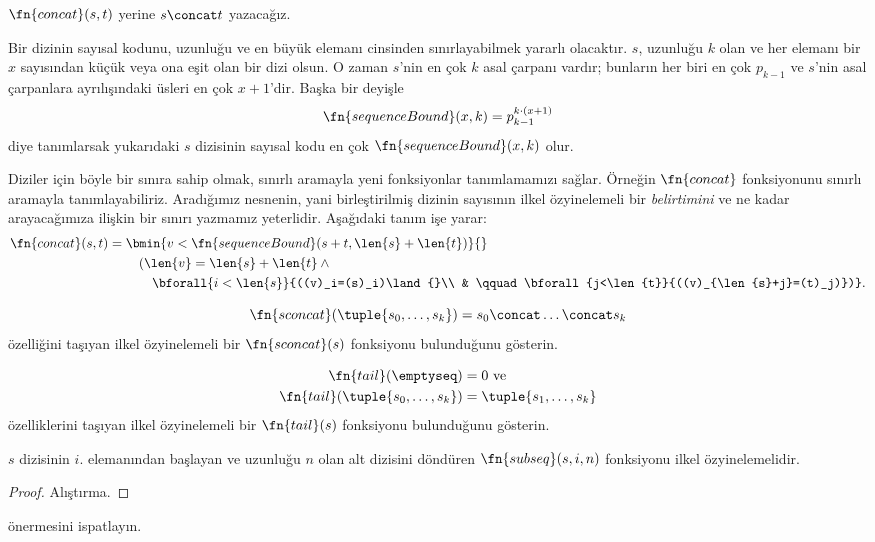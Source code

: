 $\fn{concat}(s,t)$ yerine $s\concat t$ yazacağız.

Bir dizinin sayısal kodunu, uzunluğu ve en büyük elemanı cinsinden
sınırlayabilmek yararlı olacaktır. $s$, uzunluğu $k$ olan ve her elemanı
bir $x$ sayısından küçük veya ona eşit olan bir dizi olsun. O zaman $s$'nin
en çok $k$ asal çarpanı vardır; bunların her biri en çok $p_{k-1}$ ve
$s$'nin asal çarpanlara ayrılışındaki üsleri en çok $x+1$'dir. Başka bir
deyişle
\[
  \fn{sequenceBound}(x,k)=p_{k-1}^{k\cdot(x+1)}
\]
diye tanımlarsak yukarıdaki $s$ dizisinin sayısal kodu en çok
$\fn{sequenceBound}(x,k)$ olur.

Diziler için böyle bir sınıra sahip olmak, sınırlı aramayla yeni fonksiyonlar
tanımlamamızı sağlar. Örneğin $\fn{concat}$ fonksiyonunu sınırlı aramayla
tanımlayabiliriz. Aradığımız nesnenin, yani birleştirilmiş dizinin sayısının
ilkel özyinelemeli bir \emph{belirtimini} ve ne kadar arayacağımıza ilişkin
bir sınırı yazmamız yeterlidir. Aşağıdaki tanım işe yarar:
\begin{align*}
  \fn{concat}(s,t) = {} & \bmin{v<\fn{sequenceBound}(s+t,\len{s}+\len{t})}{}\\
  & \quad(\len{v}=\len{s}+\len{t}\land{}\\
  & \qquad\bforall{i<\len{s}}{((v)_i=(s)_i)\land{}\\
  & \qquad\bforall{j<\len{t}}{((v)_{\len{s}+j}=(t)_j)})}.
\end{align*}

\begin{prob}
\[
  \fn{sconcat}(\tuple{s_0,\dots,s_k})=s_0\concat\dots\concat s_k
\]
özelliğini taşıyan ilkel özyinelemeli bir $\fn{sconcat}(s)$ fonksiyonu
bulunduğunu gösterin.
\end{prob}

\begin{prob}
\begin{align*}
  \fn{tail}(\emptyseq) & = 0 \text{ ve}\\
  \fn{tail}(\tuple{s_0,\dots,s_k}) & = \tuple{s_1,\dots,s_k}
\end{align*}
özelliklerini taşıyan ilkel özyinelemeli bir $\fn{tail}(s)$ fonksiyonu
bulunduğunu gösterin.
\end{prob}

\begin{prop}
  $s$ dizisinin $i$. elemanından başlayan ve uzunluğu $n$ olan alt dizisini
  döndüren $\fn{subseq}(s,i,n)$ fonksiyonu ilkel özyinelemelidir.
\end{prop}

\begin{proof}
  Alıştırma.
\end{proof}

\begin{prob}
   önermesini ispatlayın.
\end{prob}

